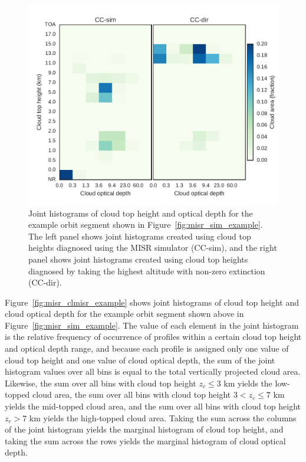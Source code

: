 \begin{figure}[tp]
\centering
\includegraphics{graphics/misr_clmisr_example.pdf}
\caption{\label{fig:misr_clmisr_example}Joint histograms of cloud top
height and optical depth for the example orbit segment shown in
Figure~\ref{fig:misr_sim_example}. The left panel shows joint histograms
created using cloud top heights diagnosed using the MISR simulator
(CC-sim), and the right panel shows joint histograms created using cloud
top heights diagnosed by taking the highest altitude with non-zero
extinction (CC-dir).}\label{fig:misrux5fclmisrux5fexample}
\end{figure}

Figure~\ref{fig:misr_clmisr_example} shows joint histograms of cloud top
height and cloud optical depth for the example orbit segment shown above
in Figure~\ref{fig:misr_sim_example}. The value of each element in the
joint histogram is the relative frequency of occurrence of profiles
within a certain cloud top height and optical depth range, and because
each profile is assigned only one value of cloud top height and one
value of cloud optical depth, the sum of the joint histogram values over
all bins is equal to the total vertically projected cloud area.
Likewise, the sum over all bins with cloud top height \(z_c \le 3\) km
yields the low-topped cloud area, the sum over all bins with cloud top
height \(3 < z_c \le 7\) km yields the mid-topped cloud area, and the
sum over all bins with cloud top height \(z_c > 7\) km yields the
high-topped cloud area. Taking the sum across the columns of the joint
histogram yields the marginal histogram of cloud top height, and taking
the sum across the rows yields the marginal histogram of cloud optical
depth.

